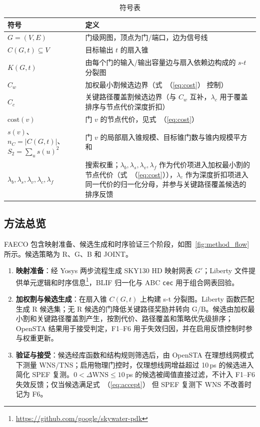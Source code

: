 \documentclass[twocolumn,10pt,fontset=windows]{ctexart}
\renewcommand{\eqref}[1]{\textup{（\ref{#1}）}}
\begin{document}
\begin{table}[ht]
\centering
\caption{符号表}
\label{tab:symbols}
\scriptsize
\setlength{\tabcolsep}{2pt}
\renewcommand{\arraystretch}{0.9}
\begin{tabular}{p{2.6cm}p{4.9cm}}
\toprule
\textbf{符号} & \textbf{定义} \\
\midrule
$G = (V, E)$ & 门级网图，顶点为门/端口，边为信号线 \\
$C(G, t) \subseteq V$ & 目标输出 $t$ 的扇入锥 \\
$K(G, t)$ & 由每个门的输入/输出容量边与扇入依赖边构成的 $s$-$t$ 分裂图 \\
$C_w$ & 加权最小割候选边界（式~\eqref{eq:cost} 控制） \\
$C_c$ & 关键路径覆盖割候选边界（与 $C_w$ 互补，$\lambda_c$ 用于覆盖排序与节点代价深度折扣） \\
$\mathrm{cost}(v)$ & 门 $v$ 的节点代价，见式~\eqref{eq:cost} \\
$s(v)$、$n_C=|C(G,t)|$、$S_2=\sum_u s(u)^2$ & 门 $v$ 的局部扇入锥规模、目标锥门数与锥内规模平方和 \\
$\lambda_b,\lambda_s,\lambda_v,\lambda_c,\lambda_f$ & 搜索权重；$\lambda_b,\lambda_s,\lambda_v,\lambda_f$ 作为代价项进入加权最小割的节点代价（式~\eqref{eq:cost}），$\lambda_c$ 作为深度折扣项进入同一代价的归一化分母，并参与关键路径覆盖候选的排序反馈 \\
\bottomrule
\end{tabular}
\end{table}

\subsection{方法总览}\label{sec:overview}

FAECO 包含映射准备、候选生成和时序验证三个阶段，如图~\ref{fig:method_flow} 所示。候选策略为 R、G、B 和 JOINT。

\begin{enumerate}
  \item[(a)] \textbf{映射准备}：经 Yosys 两步流程生成 SKY130 HD 映射网表 $G'$；Liberty 文件提供单元逻辑和时序信息\footnote{\url{https://github.com/google/skywater-pdk}}，BLIF 归一化与 ABC \texttt{cec}\cite{abc} 用于组合网表回验。
  \item[(b)] \textbf{加权割与候选生成}：在扇入锥 $C(G,t)$ 上构建 s-t 分裂图。Liberty 函数匹配生成 R 候选集；无 R 候选的门降低关键路径奖励并转向 G/B。候选由加权最小割和关键路径覆盖割产生，按割代价、路径覆盖和策略优先级排序；OpenSTA 结果用于接受判定，F1--F6 用于失效归因，并在启用反馈控制时参与权重更新。
  \item[(c)] \textbf{验证与接受}：候选经库函数和结构规则筛选后，由 OpenSTA 在理想线网模式下测量 WNS/TNS；启用物理门控时，仅理想线网增益超过 10\,ps 的候选进入简化 SPEF 复测。$0<\Delta\mathrm{WNS}\le10\,$ps 的候选被阈值直接过滤，不计入 F1--F6 失效反馈；仅当候选满足式~\eqref{eq:accept} 但 SPEF 复测下 WNS 不改善时记为 F6。
\end{enumerate}
\end{document}
